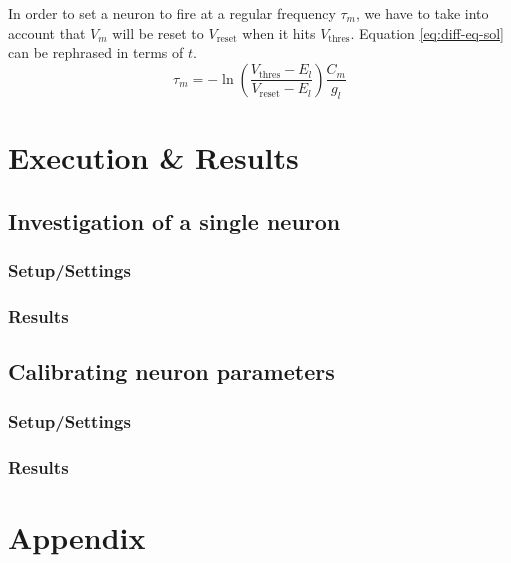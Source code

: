 \documentclass[a4paper]{article}
\begin{document}
In order to set a neuron to fire at a regular frequency $\tau_m$, we have to take
into account that $V_m$ will be reset to $V_\text{reset}$ when it hits
$V_\text{thres}$. Equation \eqref{eq:diff-eq-sol} can be rephrased in terms of
$t$.
\[
    \tau_m = -\ln(\frac{V_\text{thres} - E_l}{V_\text{reset} - E_l})
    \frac{C_m}{g_l}
\]

\section{Execution \& Results}

\subsection{Investigation of a single neuron}
\subsubsection{Setup/Settings}
\subsubsection{Results}

\subsection{Calibrating neuron parameters}
\subsubsection{Setup/Settings}
\subsubsection{Results}




\section{Appendix}
\end{document}
